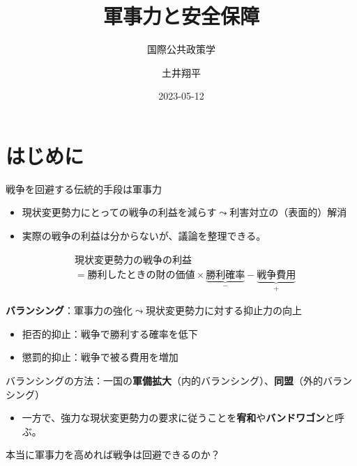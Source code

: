 \documentclass[
  xelatex,
  ja=standard]{bxjsarticle}
\title{軍事力と安全保障}
\subtitle{国際公共政策学}
\author{土井翔平}
\date{2023-05-12}
\providecommand{\tightlist}{%
  \setlength{\itemsep}{0pt}\setlength{\parskip}{0pt}}\usepackage{longtable,booktabs,array}
\begin{document}
\maketitle
\ifdefined\Shaded\renewenvironment{Shaded}{\begin{tcolorbox}[interior hidden, frame hidden, borderline west={3pt}{0pt}{shadecolor}, breakable, boxrule=0pt, sharp corners, enhanced]}{\end{tcolorbox}}\fi

\hypertarget{ux306fux3058ux3081ux306b}{%
\section*{はじめに}\label{ux306fux3058ux3081ux306b}}

戦争を回避する伝統的手段は軍事力

\begin{itemize}
\tightlist
\item
  現状変更勢力にとっての戦争の利益を減らす\(\leadsto\)利害対立の（表面的）解消
\item
  実際の戦争の利益は分からないが、議論を整理できる。
\end{itemize}

\[
\begin{split}
&\textrm{現状変更勢力の戦争の利益} \\
&= \textrm{勝利したときの財の価値} \times \underbrace{\textrm{勝利確率}}_{-} - \underbrace{\textrm{戦争費用}}_{+}
\end{split}
\]

\textbf{バランシング}：軍事力の強化\(\leadsto\)現状変更勢力に対する抑止力の向上

\begin{itemize}
\tightlist
\item
  拒否的抑止：戦争で勝利する確率を低下
\item
  懲罰的抑止：戦争で被る費用を増加
\end{itemize}

バランシングの方法：一国の\textbf{軍備拡大}（内的バランシング）、\textbf{同盟}（外的バランシング）

\begin{itemize}
\tightlist
\item
  一方で、強力な現状変更勢力の要求に従うことを\textbf{宥和}や\textbf{バンドワゴン}と呼ぶ\citep{schweller1994}。
\end{itemize}

本当に軍事力を高めれば戦争は回避できるのか？
\end{document}
